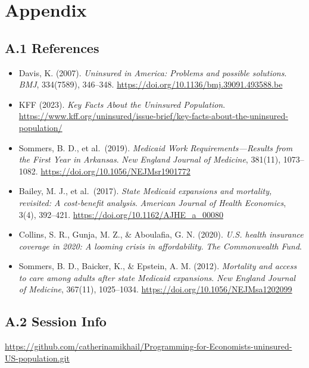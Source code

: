 \documentclass[
]{article}
\providecommand{\tightlist}{%
  \setlength{\itemsep}{0pt}\setlength{\parskip}{0pt}}
\begin{document}
\section{Appendix}\label{appendix}

\subsection{A.1 References}\label{a.1-references}

\begin{itemize}
\tightlist
\item
  Davis, K. (2007). \emph{Uninsured in America: Problems and possible
  solutions}. \emph{BMJ}, 334(7589), 346--348.
  \url{https://doi.org/10.1136/bmj.39091.493588.be}
\item
  KFF (2023). \emph{Key Facts About the Uninsured Population}.
  \url{https://www.kff.org/uninsured/issue-brief/key-facts-about-the-uninsured-population/}
\item
  Sommers, B. D., et al.~(2019). \emph{Medicaid Work
  Requirements---Results from the First Year in Arkansas}. \emph{New
  England Journal of Medicine}, 381(11), 1073--1082.
  \url{https://doi.org/10.1056/NEJMsr1901772}
\item
  Bailey, M. J., et al.~(2017). \emph{State Medicaid expansions and
  mortality, revisited: A cost-benefit analysis}. \emph{American Journal
  of Health Economics}, 3(4), 392--421.
  \url{https://doi.org/10.1162/AJHE_a_00080}
\item
  Collins, S. R., Gunja, M. Z., \& Aboulafia, G. N. (2020). \emph{U.S.
  health insurance coverage in 2020: A looming crisis in affordability}.
  \emph{The Commonwealth Fund}.
\item
  Sommers, B. D., Baicker, K., \& Epstein, A. M. (2012). \emph{Mortality
  and access to care among adults after state Medicaid expansions}.
  \emph{New England Journal of Medicine}, 367(11), 1025--1034.
  \url{https://doi.org/10.1056/NEJMsa1202099}
\end{itemize}

\subsection{A.2 Session Info}\label{a.2-session-info}

\url{https://github.com/catherinamikhail/Programming-for-Economists-uninsured-US-population.git}
\end{document}
